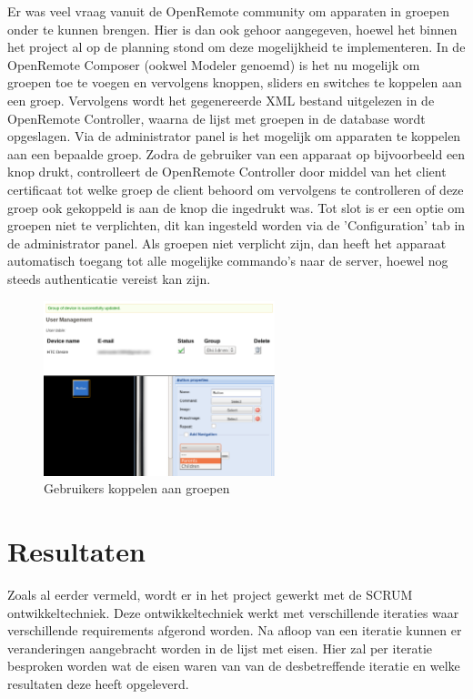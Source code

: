 \documentclass[]{article}
\begin{document}
Er was veel vraag vanuit de OpenRemote community om apparaten in groepen onder
te kunnen brengen. Hier is dan ook gehoor aangegeven, hoewel het binnen het
project al op de planning stond om deze mogelijkheid te implementeren. In de
OpenRemote Composer (ookwel Modeler genoemd) is het nu mogelijk om groepen toe
te voegen en vervolgens knoppen, sliders en switches te koppelen aan een groep. Vervolgens
wordt het gegenereerde XML bestand uitgelezen in de OpenRemote Controller,
waarna de lijst met groepen in de database wordt opgeslagen. Via de
administrator panel is het mogelijk om apparaten te koppelen aan een bepaalde
groep. Zodra de gebruiker van een apparaat op bijvoorbeeld een knop drukt,
controlleert de OpenRemote Controller door middel van het client certificaat tot
welke groep de client behoord om vervolgens te controlleren of deze groep ook
gekoppeld is aan de knop die ingedrukt was.  Tot slot is er een optie om groepen
niet te verplichten, dit kan ingesteld worden via de 'Configuration' tab in de
administrator panel. Als groepen niet verplicht zijn, dan heeft het apparaat
automatisch toegang tot alle mogelijke commando's naar de server, hoewel nog steeds
authenticatie vereist kan zijn.

\begin{figure}[htpb]
   \begin{center}
     \includegraphics[width=0.6\textwidth]{usergroups.pdf}
   \end{center}
   \caption{Gebruikers koppelen aan groepen}
\end{figure}

\newpage
\section{Resultaten}

Zoals al eerder vermeld, wordt er in het project gewerkt met de SCRUM
ontwikkeltechniek. Deze ontwikkeltechniek werkt met verschillende iteraties
waar verschillende requirements afgerond worden. Na afloop van een iteratie
kunnen er veranderingen aangebracht worden in de lijst met eisen. Hier zal
per iteratie besproken worden wat de eisen waren van van de desbetreffende
iteratie en welke resultaten deze heeft opgeleverd.
\end{document}
